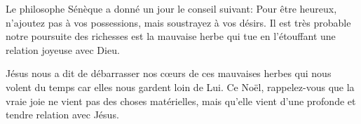 Le philosophe Sénèque a donné un jour le conseil suivant: \og Pour être heureux, n'ajoutez pas à vos possessions, mais soustrayez à vos désirs. \fg{} Il est très probable notre poursuite des richesses est la mauvaise herbe qui tue en l'étouffant une relation joyeuse avec Dieu.

\pagebreak
Jésus nous a dit de débarrasser nos cœurs de ces mauvaises herbes qui nous volent du temps car elles nous gardent loin de Lui. Ce Noël, rappelez-vous que la vraie joie ne vient pas des choses matérielles, mais qu'elle vient d'une profonde et tendre relation avec Jésus.



\ornrule



